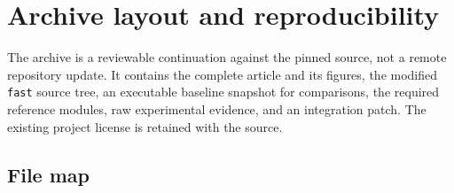\section{Archive layout and reproducibility}
\label{app:reproducibility}

The archive is a reviewable continuation against the pinned source,
not a remote repository update. It contains the complete article and
its figures, the modified \texttt{fast} source tree, an executable
baseline snapshot for comparisons, the required reference modules,
raw experimental evidence, and an integration patch. The existing
project license is retained with the source.

\subsection{File map}

